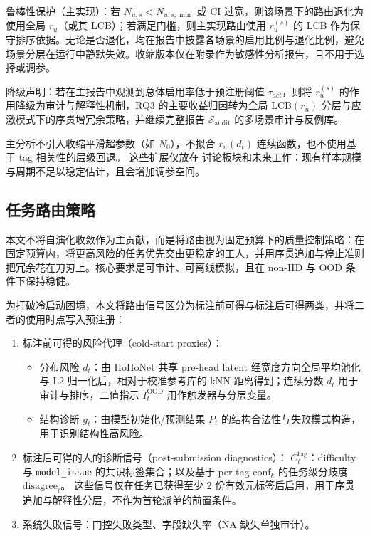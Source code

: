 \noindent 鲁棒性保护（主实现）：若 $N_{u,s}<N_{u,s,\min}$ 或 CI 过宽，则该场景下的路由退化为使用全局 $r_u$（或其 LCB）；若满足门槛，则主实现路由使用 $r_u^{(s)}$ 的 LCB 作为保守排序依据。无论是否退化，均在报告中披露各场景的启用比例与退化比例，避免场景分层在运行中静默失效。收缩版本仅在附录作为敏感性分析报告，且不用于选择或调参。

\noindent 降级声明：若在主报告中观测到总体启用率低于预注册阈值 $\tau_{act}$，则将 $r_u^{(s)}$ 的作用降级为审计与解释性机制，RQ3 的主要收益归因转为全局 $\mathrm{LCB}(r_u)$ 分层与应激模式下的序贯增冗余策略，并继续完整报告 $\mathcal{S}_{\mathrm{audit}}$ 的多场景审计与反例库。

主分析不引入收缩平滑超参数（如 $N_0$），不拟合 $r_u\left(d_t\right)$ 连续函数，也不使用基于 tag 相关性的层级回退。
这些扩展仅放在 讨论板块和未来工作：现有样本规模与周期不足以稳定估计，且会增加调参空间。

\subsection{任务路由策略}

本文不将自演化收敛作为主贡献，而是将路由视为固定预算下的质量控制策略：在固定预算内，将更高风险的任务优先交由更稳定的工人，并用序贯追加与停止准则把冗余花在刀刃上。核心要求是可审计、可离线模拟，且在 non-IID 与 OOD 条件下保持稳健。

为打破冷启动困境，本文将路由信号区分为标注前可得与标注后可得两类，并将二者的使用时点写入预注册：
\begin{enumerate}
    \item 标注前可得的风险代理（cold-start proxies）：
    \begin{itemize}
        \item 分布风险 $d_t$：由 HoHoNet 共享 pre-head latent 经宽度方向全局平均池化与 L2 归一化后，相对于校准参考库的 kNN 距离得到；连续分数 $d_t$ 用于审计与排序，二值指示 $I_t^{\mathrm{OOD}}$ 用作触发器与分层变量。
        \item 结构诊断 $g_t$：由模型初始化/预测结果 $P_t$ 的结构合法性与失败模式构造，用于识别结构性高风险。
    \end{itemize}
    \item 标注后可得的人的诊断信号（post-submission diagnostics）：
    $C_t^{\mathrm{tag}}$：difficulty 与 \texttt{model\_issue} 的共识标签集合；以及基于 per-tag $\mathrm{conf}_k$ 的任务级分歧度 $\mathrm{disagree}_t$。
    这些信号仅在任务已获得至少 2 份有效元标签后启用，用于序贯追加与解释性分层，不作为首轮派单的前置条件。
    \item 系统失败信号：门控失败类型、字段缺失率（NA 缺失单独审计）。
\end{enumerate}

